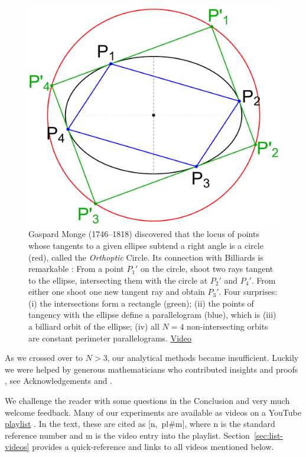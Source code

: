 %
\begin{figure}[ht]
    \centering
    \includegraphics[width=.5\textwidth]{pics/u0200_monge_orthoptic.pdf}
    \caption{Gaspard Monge (1746--1818) discovered that the locus of points whose tangents to a given ellipse subtend a right angle is a circle (red), called the {\em Orthoptic} Circle. Its connection with Billiards is remarkable \cite{connes07}: From a point $P_1'$ on the circle, shoot two rays tangent to the ellipse, intersecting them with the circle at $P_2'$ and $P_4'$. From either one shoot one new tangent ray and obtain $P_3'$. Four surprises: (i) the intersections form a rectangle (green); (ii) the points of tangency with the ellipse define a parallelogram (blue), which is (iii) a billiard orbit of the ellipse; (iv) all $N=4$ non-intersecting orbits are constant perimeter parallelograms. 
    \href{https://youtu.be/9fI3iM2jrmI}{Video} \cite[pl\#5]{dsr_math_intell_playlist}}    \label{fig:monge-orthoptic}
\end{figure}

As we crossed over to $N>3$, our analytical methods became insufficient. Luckily we were helped by generous mathematicians who contributed insights and proofs \cite{akopyan19_private_meromorphic,helman19,dominique19,olga19_mitten,sergei19_private_circles,sergei19_private_meromorphic}, see Acknowledgements and \cite{sergei2020}. 

We challenge the reader with some questions in the Conclusion and very much welcome feedback. Many of our experiments are available as videos on a YouTube \href{https://bit.ly/2kTvPPr}{playlist} \cite{dsr_math_intell_playlist}. In the text, these are cited as {[n,~pl\#m]}, where n is the standard reference number and m is the video entry into the playlist. Section~\ref{sec:list-videos} provides a quick-reference and links to all videos mentioned below.